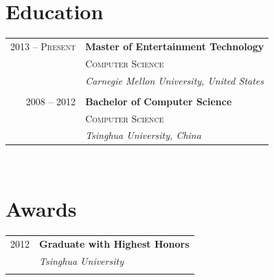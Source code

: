 \documentclass[10pt]{article}
\begin{document}
{\begin{minipage}[t]{0.44\textwidth}

\section{Education} 

\begin{tabular}{rl} %


2013 -- \textsc{Present} & \textbf{Master of Entertainment Technology} \\ 
& \textsc{Computer Science} \\ 
& \textit{Carnegie Mellon University, United States}\\
&\\


2008 -- 2012 & \textbf{Bachelor of Computer Science}\\
& \textsc{Computer Science} \\
& \textit{Tsinghua University, China} 
	

\end{tabular}\\[10pt]


\section{Awards} 

\begin{tabular}{rl}
2012	 & \textbf{Graduate with Highest Honors}\\
& \textit{Tsinghua University}\\ \\



\end{tabular}
\end{minipage}}
\end{document}
